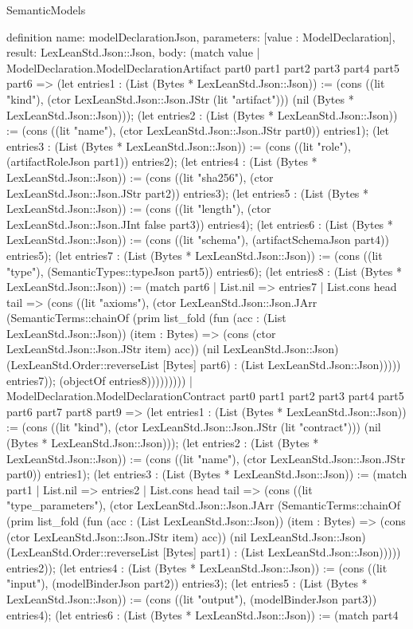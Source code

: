 \begin{lexlean}{SemanticModels}
\begin{semanticmodule}
definition{
  name: modelDeclarationJson,
  parameters: [value : ModelDeclaration],
  result: LexLeanStd.Json::Json,
  body: (match value
    | ModelDeclaration.ModelDeclarationArtifact part0 part1 part2 part3 part4 part5 part6 => (let entries1 : (List (Bytes * LexLeanStd.Json::Json)) := (cons ((lit "kind"), (ctor LexLeanStd.Json::Json.JStr (lit "artifact"))) (nil (Bytes * LexLeanStd.Json::Json))); (let entries2 : (List (Bytes * LexLeanStd.Json::Json)) := (cons ((lit "name"), (ctor LexLeanStd.Json::Json.JStr part0)) entries1); (let entries3 : (List (Bytes * LexLeanStd.Json::Json)) := (cons ((lit "role"), (artifactRoleJson part1)) entries2); (let entries4 : (List (Bytes * LexLeanStd.Json::Json)) := (cons ((lit "sha256"), (ctor LexLeanStd.Json::Json.JStr part2)) entries3); (let entries5 : (List (Bytes * LexLeanStd.Json::Json)) := (cons ((lit "length"), (ctor LexLeanStd.Json::Json.JInt false part3)) entries4); (let entries6 : (List (Bytes * LexLeanStd.Json::Json)) := (cons ((lit "schema"), (artifactSchemaJson part4)) entries5); (let entries7 : (List (Bytes * LexLeanStd.Json::Json)) := (cons ((lit "type"), (SemanticTypes::typeJson part5)) entries6); (let entries8 : (List (Bytes * LexLeanStd.Json::Json)) := (match part6
      | List.nil => entries7
      | List.cons head tail => (cons ((lit "axioms"), (ctor LexLeanStd.Json::Json.JArr (SemanticTerms::chainOf (prim list_fold (fun (acc : (List LexLeanStd.Json::Json)) (item : Bytes) => (cons (ctor LexLeanStd.Json::Json.JStr item) acc)) (nil LexLeanStd.Json::Json) (LexLeanStd.Order::reverseList [Bytes] part6) : (List LexLeanStd.Json::Json))))) entries7)); (objectOf entries8)))))))))
    | ModelDeclaration.ModelDeclarationContract part0 part1 part2 part3 part4 part5 part6 part7 part8 part9 => (let entries1 : (List (Bytes * LexLeanStd.Json::Json)) := (cons ((lit "kind"), (ctor LexLeanStd.Json::Json.JStr (lit "contract"))) (nil (Bytes * LexLeanStd.Json::Json))); (let entries2 : (List (Bytes * LexLeanStd.Json::Json)) := (cons ((lit "name"), (ctor LexLeanStd.Json::Json.JStr part0)) entries1); (let entries3 : (List (Bytes * LexLeanStd.Json::Json)) := (match part1
      | List.nil => entries2
      | List.cons head tail => (cons ((lit "type_parameters"), (ctor LexLeanStd.Json::Json.JArr (SemanticTerms::chainOf (prim list_fold (fun (acc : (List LexLeanStd.Json::Json)) (item : Bytes) => (cons (ctor LexLeanStd.Json::Json.JStr item) acc)) (nil LexLeanStd.Json::Json) (LexLeanStd.Order::reverseList [Bytes] part1) : (List LexLeanStd.Json::Json))))) entries2)); (let entries4 : (List (Bytes * LexLeanStd.Json::Json)) := (cons ((lit "input"), (modelBinderJson part2)) entries3); (let entries5 : (List (Bytes * LexLeanStd.Json::Json)) := (cons ((lit "output"), (modelBinderJson part3)) entries4); (let entries6 : (List (Bytes * LexLeanStd.Json::Json)) := (match part4
}
\end{semanticmodule}
\end{lexlean}
